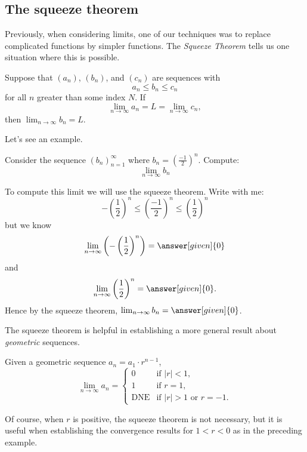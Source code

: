 \documentclass{ximera}
\begin{document}
\subsection{The squeeze theorem}

%

Previously, when considering limits, one of our techniques was to replace 
complicated functions by simpler functions. The \textit{Squeeze Theorem}
tells us one situation where this is possible.

\begin{theorem}
  Suppose that $(a_n)$, $(b_n)$, and $(c_n)$ are sequences with
  \[
  a_n \le b_n \le c_n
  \]
  for all $n$ greater than some index $N$. If
  \[
  \lim_{n\to\infty} a_n = L = \lim_{n\to\infty} c_n,
  \] 
  then $\lim_{n\to\infty} b_n = L$.
\end{theorem}

Let's see an example.

\begin{example}
  Consider the sequence $(b_n)_{n=1}^{\infty}$ where $b_n =
  \left(\frac{-1}{2}\right)^n$. Compute:
  \[
  \lim_{n\to\infty}b_n
  \]
  \begin{explanation}
    To compute this limit we will use the squeeze theorem. Write with
    me:
    \[
    -\left(\frac{1}{2}\right)^n\le \left(\frac{-1}{2}\right)^n \le \left(\frac{1}{2}\right)^n
    \]
    but we know
    \[
    \lim_{n\to \infty}\left(-\left(\frac{1}{2}\right)^n\right) = \answer[given]{0}
    \]
    and
    \[
    \lim_{n\to \infty}\left(\frac{1}{2}\right)^n =\answer[given]{0}.
    \]
    Hence by the squeeze theorem, $\lim_{n\to\infty} b_n = \answer[given]{0}$.
  \end{explanation}
\end{example}

%

The squeeze theorem is helpful in establishing a more general result about \emph{geometric} sequences.
\begin{theorem}
  Given a geometric sequence $a_n = a_1 \cdot r^{n-1}$,
  \[
  \lim_{n\to\infty} a_n =
  \begin{cases}
    0 &\text{if $|r|<1$,}\\
    1 &\text{if $r=1$,}\\
    \text{DNE} &\text{if $|r|>1$ or $r=-1$.}
  \end{cases}
  \]
\end{theorem}
Of course, when $r$ is positive, the squeeze theorem is not necessary, but it is useful when establishing the convergence results for $1<r<0$ as in the preceding example.
\end{document}
